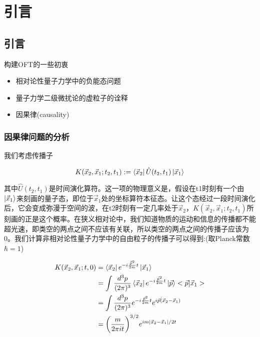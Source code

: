 \section{引言}

\subsection{引言}

构建OFT的一些初衷

\begin{itemize}
    \item 相对论性量子力学中的负能态问题
    \item 量子力学二级微扰论的虚粒子的诠释
    \item 因果律(causality)
\end{itemize}

\subsubsection{因果律问题的分析}

我们考虑传播子

\begin{equation}
    K(\vec{x}_2,\vec{x}_1; t_2, t_1):=\bra{\vec{x}_2}\hat{U}(t_2, t_1)\ket{\vec{x}_1}
\end{equation}

其中$\hat{U}(t_2, t_1)$是时间演化算符。这一项的物理意义是，假设在t1时刻有一个由$\ket{\vec{x}_1}$来刻画的量子态，即位于$\vec{x}_1$处的坐标算符本征态。让这个态经过一段时间演化后，它会变成弥漫于空间的波，在t2时刻有一定几率处于$\vec{x}_2$，$K(\vec{x}_2,\vec{x}_1; t_2, t_1)$所刻画的正是这个概率。在狭义相对论中，我们知道物质的运动和信息的传播都不能超光速，即类空的两点之间不应该有关联，所以类空的两点之间的传播子应该为0。我们计算非相对论性量子力学中的自由粒子的传播子可以得到:(取Planck常数$\hbar=1$)

\begin{equation}
    \begin{split}
        K(\vec{x}_2,\vec{x}_1; t, 0) &= \bra{\vec{x}_2}e^{-i\frac{\vec{\hat{p}}^2}{2m}t}\ket{\vec{x}_1} \\
            &= \int \frac{d^3p}{(2\pi)^3} \bra{\vec{x}_2}e^{-i\frac{\vec{\hat{p}}^2}{2m}t}\ket{\vec{p}}<\vec{p}|\vec{x}_1> \\
            &= \int \frac{d^3p}{(2\pi)^3} e^{-i\frac{\vec{p}^2}{2m}t} e^{i\vec{p}\dot(\vec{x}_2-\vec{x}_1)} \\
            &= \biggl(\frac{m}{2\pi it}\biggr)^{3/2} e^{im|\vec{x}_2-\vec{x}_1|/2t}
    \end{split}
\end{equation}

